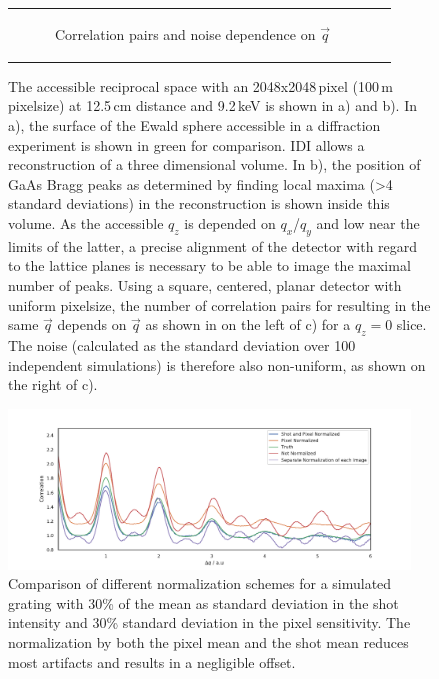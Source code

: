 \begin{figure}
\begin{tabular}[t]{cc}
\begin{subfigure}{0.52\textwidth}
			\caption{Correlation pairs and noise dependence on $\vec{q}$ } 
			\label{fig:pairnoise}
		\end{subfigure}\\
	\end{tabular}
	\caption[Accessible reciprocal space]{The accessible reciprocal space with an 2048x2048\,pixel (100\,\textmu m pixelsize) at 12.5\,cm distance and 9.2\,keV is shown in a) and b). In a), the surface of the Ewald sphere accessible in a diffraction experiment is shown in green for comparison. IDI allows a reconstruction of a three dimensional volume. In b), the position of GaAs Bragg peaks as determined by finding local maxima (>4 standard deviations) in the reconstruction is shown inside this volume. As the accessible $q_z$ is depended on $q_x$/$q_y$ and low near the limits of the latter, a precise alignment of the detector with regard to the lattice planes is necessary to be able to image the maximal number of peaks. Using a square, centered, planar detector with uniform pixelsize, the number of correlation pairs for resulting in the same $\vec{q}$ depends on $\vec{q}$ as shown in on the left of c) for a $q_z=0$ slice. The noise (calculated as the standard deviation over 100 independent simulations) is therefore also non-uniform, as shown on the right of c).}
	
\end{figure}

\begin{figure}
	\centering
	\includegraphics[width=0.95\textwidth]{images/normalisation_comp.pdf}
	\caption[Comparison of Normalization Techniques]{Comparison of different normalization schemes for a simulated grating with 30\% of the mean as standard deviation in the shot intensity and 30\% standard deviation in the pixel sensitivity. The normalization by both the pixel mean and the shot mean reduces most artifacts and results in a negligible offset.}
	\label{fig:norm_com}
\end{figure}

